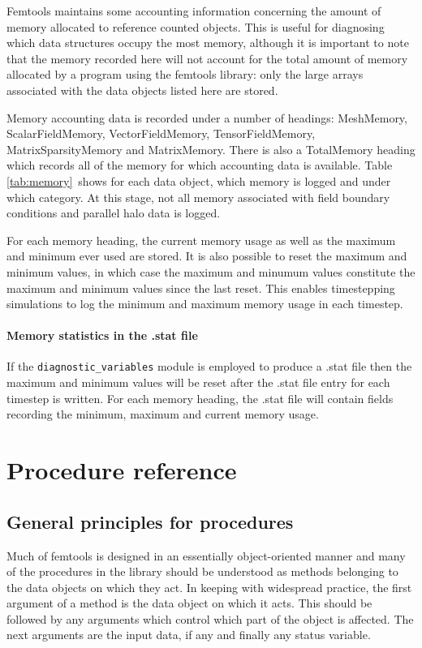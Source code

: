 \documentclass[a4paper, 11pt]{book}
\begin{document}
Femtools  maintains some accounting information concerning the amount of
memory allocated to reference counted objects. This is useful for diagnosing
which data structures occupy the most memory, although it is important to
note that the memory recorded here will not account for the total amount of
memory allocated by a program using the femtools library: only the large
arrays associated with the data objects listed here are stored.

Memory accounting data is recorded under a number of headings: MeshMemory,
ScalarFieldMemory, VectorFieldMemory, TensorFieldMemory,
MatrixSparsityMemory and MatrixMemory. There is also a TotalMemory heading
which records all of the memory for which accounting data is available.
Table \ref{tab:memory}\ shows for each data object, which memory is logged
and under which category. At this stage, not all memory associated with
field boundary conditions and parallel halo data is logged.

For each memory heading, the current memory usage as well as the maximum and
minimum ever used are stored. It is also possible to reset the maximum and
minimum values, in which case the maximum and minumum values constitute the
maximum and minimum values since the last reset. This enables timestepping
simulations to log the minimum and maximum memory usage in each timestep. 

\subsection{Memory statistics in the .stat file}

If the \lstinline+diagnostic_variables+ module is employed to produce a
.stat file then the maximum and minimum values will be reset
after the .stat file entry for each timestep is written. For each memory
heading, the .stat file will contain fields recording the minimum, maximum
and current memory usage.

\part{Procedure reference}


\chapter{General principles for procedures}

Much of femtools is designed in an essentially object-oriented manner and
many of the procedures in the library should be understood as methods
belonging to the data objects on which they act. In keeping with widespread
practice, the first argument of a method is the data object on which it
acts. This should be followed by any arguments which control which part of
the object is affected. The next arguments are the input data, if any and
finally any status variable.
\end{document}
